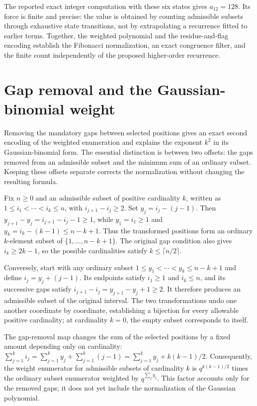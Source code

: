 \documentclass[11pt]{article}
\begin{document}
The reported exact integer computation with these six states gives $a_{12}=128$. Its force is finite and precise: the value is obtained by counting admissible subsets through exhaustive state transitions, not by extrapolating a recurrence fitted to earlier terms. Together, the weighted polynomial and the residue-and-flag encoding establish the Fibonacci normalization, an exact congruence filter, and the finite count independently of the proposed higher-order recurrence.

\section{Gap removal and the Gaussian-binomial weight}
Removing the mandatory gaps between selected positions gives an exact second encoding of the weighted enumeration and explains the exponent $k^2$ in its Gaussian-binomial form. The essential distinction is between two offsets: the gaps removed from an admissible subset and the minimum sum of an ordinary subset. Keeping these offsets separate corrects the normalization without changing the resulting formula.

Fix $n\geq 0$ and an admissible subset of positive cardinality $k$, written as $1\leq i_1<\cdots<i_k\leq n$, with $i_{j+1}-i_j\geq 2$. Set $y_j=i_j-(j-1)$. Then $y_{j+1}-y_j=i_{j+1}-i_j-1\geq 1$, while $y_1=i_1\geq 1$ and $y_k=i_k-(k-1)\leq n-k+1$. Thus the transformed positions form an ordinary $k$-element subset of $\{1,\ldots,n-k+1\}$. The original gap condition also gives $i_k\geq 2k-1$, so the possible cardinalities satisfy $k\leq\lceil n/2\rceil$.

Conversely, start with any ordinary subset $1\leq y_1<\cdots<y_k\leq n-k+1$ and define $i_j=y_j+(j-1)$. Its endpoints satisfy $i_1\geq 1$ and $i_k\leq n$, and its successive gaps satisfy $i_{j+1}-i_j=y_{j+1}-y_j+1\geq 2$. It therefore produces an admissible subset of the original interval. The two transformations undo one another coordinate by coordinate, establishing a bijection for every allowable positive cardinality; at cardinality $k=0$, the empty subset corresponds to itself.

The gap-removal map changes the sum of the selected positions by a fixed amount depending only on cardinality: $\sum_{j=1}^{k}i_j=\sum_{j=1}^{k}y_j+\sum_{j=1}^{k}(j-1)=\sum_{j=1}^{k}y_j+k(k-1)/2$. Consequently, the weight enumerator for admissible subsets of cardinality $k$ is $q^{k(k-1)/2}$ times the ordinary subset enumerator weighted by $q^{\sum_j y_j}$. This factor accounts only for the removed gaps; it does not yet include the normalization of the Gaussian polynomial.
\end{document}
